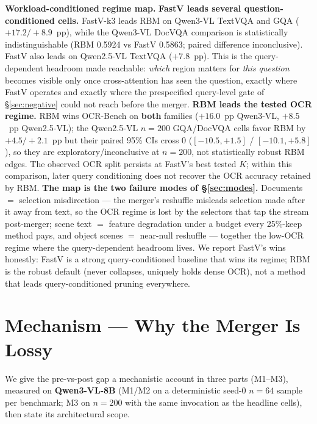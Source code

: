 \documentclass[journal]{IEEEtran}
\begin{document}
\textbf{Workload-conditioned regime map.}
\textbf{FastV leads several question-conditioned cells.} FastV-k3 leads RBM on
Qwen3-VL TextVQA and GQA ($+17.2 / +8.9$~pp), while the Qwen3-VL DocVQA
comparison is statistically indistinguishable (RBM 0.5924 vs FastV 0.5863;
paired difference inconclusive). FastV also leads on Qwen2.5-VL TextVQA
($+7.8$~pp). This is the query-dependent
headroom made reachable: \emph{which} region matters for \emph{this question}
becomes visible only once cross-attention has seen the question, exactly where
FastV operates and exactly where the prespecified query-level gate of
\S\ref{sec:negative} could not reach before the merger. \textbf{RBM leads the
tested OCR regime.} RBM wins OCR-Bench on \textbf{both} families ($+16.0$~pp
Qwen3-VL, $+8.5$~pp Qwen2.5-VL); the Qwen2.5-VL $n = 200$ GQA/DocVQA cells
favor RBM by $+4.5 / +2.1$~pp but their paired 95\% CIs cross 0
($[-10.5, +1.5]$ / $[-10.1, +5.8]$), so they are exploratory/inconclusive at
$n = 200$, not statistically robust RBM edges. The observed OCR split persists
at FastV's best tested $K$; within this comparison, later query conditioning
does not recover the OCR accuracy retained by RBM. \textbf{The map is the two
failure modes of \S\ref{sec:modes}.} Documents $=$ selection misdirection ---
the merger's reshuffle misleads selection made after it away from text, so the
OCR regime is lost by the selectors that tap the stream post-merger; scene text
$=$ feature degradation under a budget every 25\%-keep method pays, and object
scenes $=$ near-null reshuffle --- together the low-OCR regime where the
query-dependent headroom lives. We report FastV's wins honestly: FastV is a
strong query-conditioned baseline that wins its regime; RBM is the robust
default (never collapses, uniquely holds dense OCR), not a method that leads
query-conditioned pruning everywhere.

\section{Mechanism --- Why the Merger Is Lossy}\label{sec:mechanism}

We give the pre-vs-post gap a mechanistic account in three parts (M1--M3),
measured on \textbf{Qwen3-VL-8B} (M1/M2 on a deterministic seed-0 $n = 64$ sample
per benchmark; M3 on $n = 200$ with the same invocation as the headline cells),
then state its architectural scope.
\end{document}

